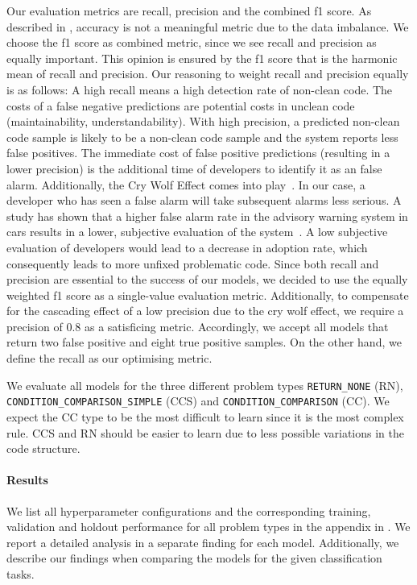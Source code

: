 Our evaluation metrics are recall, precision and the combined f1 score. As described in , accuracy is not a meaningful metric due to the data imbalance. We choose the f1 score as combined metric, since we see recall and precision as equally important. This opinion is ensured by the f1 score that is the harmonic mean of recall and precision.
Our reasoning to weight recall and precision equally is as follows:
A high recall means a high detection rate of non-clean code. The costs of a false negative predictions are potential costs in unclean code (maintainability, understandability). With high precision, a predicted non-clean code sample is likely to be a non-clean code sample and the system reports less false positives. The immediate cost of false positive predictions (resulting in a lower precision) is the additional time of developers to identify it as an false alarm.
Additionally, the Cry Wolf Effect comes into play~\cite{breznitz_cry_1984}. In our case, a developer who has seen a false alarm will take subsequent alarms less serious. A study has shown that a higher false alarm rate in the advisory warning system in cars results in a lower, subjective evaluation of the system~\cite{naujoks_cooperative_2016}. A low subjective evaluation of developers would lead to a decrease in adoption rate, which consequently leads to more unfixed problematic code. Since both recall and precision are essential to the success of our models, we decided to use the equally weighted f1 score as a single-value evaluation metric.
Additionally, to compensate for the cascading effect of a low precision due to the cry wolf effect, we require a precision of 0.8 as a satisficing metric. Accordingly, we accept all models that return two false positive and eight true positive samples. On the other hand, we define the recall as our optimising metric. 

We evaluate all models for the three different problem types \texttt{RETURN\_NONE} (RN), \texttt{CONDITION\_COMPARISON\_SIMPLE} (CCS) and \texttt{CONDITION\_COMPARISON} (CC). We expect the CC type to be the most difficult to learn since it is the most complex rule. CCS and RN should be easier to learn due to less possible variations in the code structure.

\paragraph{Results}
We list all hyperparameter configurations and the corresponding training, validation and holdout performance for all problem types in the appendix in . We report a detailed analysis in a separate finding for each model. Additionally, we describe our findings when comparing the models for the given classification tasks.



